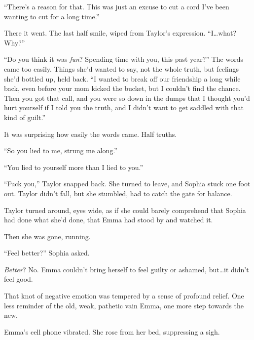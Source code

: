 ``There's a reason for that.  This was just an excuse to cut a cord I've been wanting to cut for a long time.''



There it went.  The last half smile, wiped from Taylor's expression.  ``I\ldots what?  Why?''



``Do you think it was \emph{fun}?  Spending time with you, this past year?''  The words came too easily.  Things she'd wanted to say, not the whole truth, but feelings she'd bottled up, held back.  ``I wanted to break off our friendship a long while back, even before your mom kicked the bucket, but I couldn't find the chance.  Then you got that call, and you were so down in the dumps that I thought you'd hurt yourself if I told you the truth, and I didn't want to get saddled with that kind of guilt.''



It was surprising how easily the words came.  Half truths.



``So you lied to me, strung me along.''



``You lied to yourself more than I lied to you.''



``Fuck you,'' Taylor snapped back.  She turned to leave, and Sophia stuck one foot out.  Taylor didn't fall, but she stumbled, had to catch the gate for balance.



Taylor turned around, eyes wide, as if she could barely comprehend that Sophia had done what she'd done, that Emma had stood by and watched it.



Then she was gone, running.



``Feel better?''  Sophia asked.



\emph{Better}?  No.  Emma couldn't bring herself to feel guilty or ashamed, but\ldots it didn't feel good.



That knot of negative emotion was tempered by a sense of profound relief.  One less reminder of the old, weak, pathetic vain Emma, one more step towards the new.



\sectionbreak



Emma's cell phone vibrated.  She rose from her bed, suppressing a sigh.



